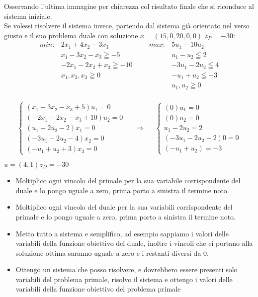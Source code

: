 \documentclass{article}
\begin{document}
Osservando l'ultima immagine per chiarezza col risultato finale che si riconduce al sistema iniziale.\\
Se volessi risolvere il sistema invece, partendo dal sistema già orientato nel verso giusto e il suo problema duale con soluzione $x=(15,0,20,0,0)$ $z_P=-30$:\\

\begin{align*}
min: &2x_1 + 4x_2 - 3x_3 & & & max: &5u_1 - 10u_2 \\
&x_1 - 3x_2 - x_3 \geqq -5  & & & &u_1 - u_2 \leqq 2\\
&-2x_1 - 2x_2 + x_3 \geqq -10 & & &  &-3u_1 - 2u_2 \leqq 4\\
&x_1,x_2,x_3 \geqq 0 & & & &-u_1 + u_2 \leqq -3\\
& & & & &u_1,u_2 \geqq 0\\
\end{align*}

\begin{align*}
\left\{ \begin{array}{rcl} (x_1 -3x_2 - x_3 + 5)u_1 = 0 \\ (-2x_1 -2x_2 - x_3 + 10)u_2 = 0 \\ (u_1 -2u_2 - 2 )x_1 = 0 \\ (-3u_1 -2u_2 - 4 )x_2 = 0 \\ (-u_1 +u_2 + 3 )x_3 = 0  \end{array}\right. & &\Rightarrow	& &\left\{ \begin{array}{rcl} (0)u_1 = 0 \\ (0)u_2 = 0 \\ u_1 -2u_2 = 2 \\ (-3u_1 -2u_2 - 2 )0 = 0 \\ (-u_1 +u_2) = -3  \end{array}\right.\\
\end{align*}
$u = (4,1) z_D= -30$

\begin{itemize}
\item Moltiplico ogni vincolo del primale per la sua variabile corrispondente del
duale e lo pongo uguale a zero, prima porto a sinistra il termine noto.\\
\item Moltiplico ogni vincolo del duale per la sua variabili corrispondente del
primale e lo pongo uguale a zero, prima porto a sinistra il termine noto.
\item Metto tutto a sistema e semplifico, ad esempio sappiamo i valori delle
variabili della funzione obiettivo del duale, inoltre i vincoli che ci portano alla
soluzione ottima saranno uguale a zero e i restanti diversi da 0.
\item Ottengo un sistema che posso risolvere, e dovrebbero essere presenti solo
variabili del problema primale, risolvo il sistema e ottengo i valori delle
variabili della funzione obiettivo del problema primale
\end{itemize}
\end{document}
